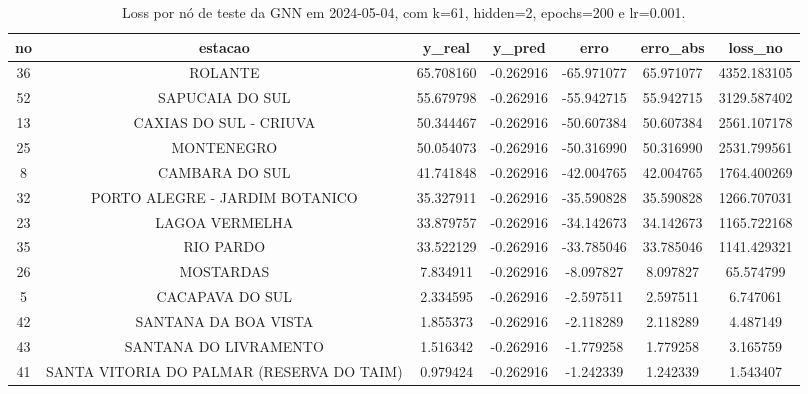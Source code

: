 \begin{table}[h]
\centering
\caption{Loss por nó de teste da GNN em 2024-05-04, com k=61, hidden=2, epochs=200 e lr=0.001.}
\label{tab:gnn_loss_nodes_k61_hidden2}
\begin{tabular}{ccccccc}
\toprule
no & estacao & y\_real & y\_pred & erro & erro\_abs & loss\_no \\
\midrule
36 & ROLANTE & 65.708160 & -0.262916 & -65.971077 & 65.971077 & 4352.183105 \\
52 & SAPUCAIA DO SUL & 55.679798 & -0.262916 & -55.942715 & 55.942715 & 3129.587402 \\
13 & CAXIAS DO SUL - CRIUVA & 50.344467 & -0.262916 & -50.607384 & 50.607384 & 2561.107178 \\
25 & MONTENEGRO & 50.054073 & -0.262916 & -50.316990 & 50.316990 & 2531.799561 \\
8 & CAMBARA DO SUL & 41.741848 & -0.262916 & -42.004765 & 42.004765 & 1764.400269 \\
32 & PORTO ALEGRE - JARDIM BOTANICO & 35.327911 & -0.262916 & -35.590828 & 35.590828 & 1266.707031 \\
23 & LAGOA VERMELHA & 33.879757 & -0.262916 & -34.142673 & 34.142673 & 1165.722168 \\
35 & RIO PARDO & 33.522129 & -0.262916 & -33.785046 & 33.785046 & 1141.429321 \\
26 & MOSTARDAS & 7.834911 & -0.262916 & -8.097827 & 8.097827 & 65.574799 \\
5 & CACAPAVA DO SUL & 2.334595 & -0.262916 & -2.597511 & 2.597511 & 6.747061 \\
42 & SANTANA DA BOA VISTA & 1.855373 & -0.262916 & -2.118289 & 2.118289 & 4.487149 \\
43 & SANTANA DO LIVRAMENTO & 1.516342 & -0.262916 & -1.779258 & 1.779258 & 3.165759 \\
41 & SANTA VITORIA DO PALMAR (RESERVA DO TAIM) & 0.979424 & -0.262916 & -1.242339 & 1.242339 & 1.543407 \\
\bottomrule
\end{tabular}
\end{table}
